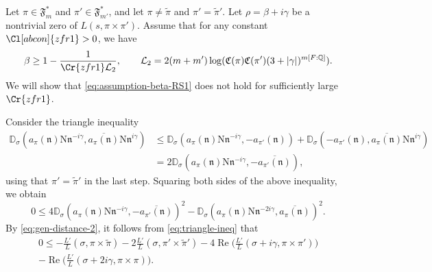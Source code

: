 \documentclass[12pt,reqno]{amsart}
\renewcommand{\tilde}{\widetilde}
\theoremstyle{remark}
\renewcommand{\tilde}{\widetilde}
\DeclareMathOperator{\Real}{Re}
\renewcommand{\tilde}{\widetilde}
\newcommand{\N}{\mathrm{N}}
\newcommand{\Q}{\mathbb{Q}}
\newcommand{\kn}{\mathfrak{n}}
\numberwithin{equation}{section}
\begin{document}
	Let $\pi\in\mathfrak{F}^*_m$ and $\pi' \in\mathfrak{F}^*_{m'}$, and let $\pi \neq\tilde{\pi}$ and $\pi'=\tilde{\pi}'$.  Let $\rho = \beta +i\gamma$ be a nontrivial zero of $L(s, \pi \times \pi')$. 
    Assume that for any constant $\Cl[abcon]{zfr1} > 0$, we have
    \begin{equation}\label{eq:assumption-beta-RS1}
		\begin{aligned}
			\beta
			\ge 1- \frac{1}{\Cr{zfr1}\mathcal{L}_2}, \qquad \mathcal{L}_2 = 2(m+m')\log(\mathfrak{C}(\pi)\mathfrak{C}(\pi') (3+|\gamma|)^{m[F:\Q]}).
		\end{aligned}
	\end{equation}
	We will show that \eqref{eq:assumption-beta-RS1} does not hold for sufficiently large $\Cr{zfr1}$. 
    
    Consider the triangle inequality
	\begin{align*}
		\mathbb{D}_{\sigma}(a_{\pi}(\kn)\N\kn^{-i\gamma}, \overline{a_{\pi}(\kn)}\N\kn^{i\gamma}) &\le \mathbb{D}_{\sigma}(a_{\pi}(\kn)\N\kn^{-i\gamma}, -a_{\pi'}(\kn)) +
		\mathbb{D}_{\sigma}(-a_{\pi'}(\kn), \overline{a_{\pi}(\kn)}\N\kn^{i\gamma})\\
		&= 2\mathbb{D}_{\sigma}(a_{\pi}(\kn)\N\kn^{-i\gamma}, -\overline{a_{\pi'}(\kn)}),
	\end{align*}
	using that $\pi' = \tilde{\pi}'$ in the last step. Squaring both sides of the above inequality, we obtain
	\begin{equation}
		\label{eq:triangle-ineq}
		0\le 4\mathbb{D}_{\sigma}(a_{\pi}(\kn)\N\kn^{-i\gamma}, -\overline{a_{\pi'}(\kn)})^2-\mathbb{D}_{\sigma}(a_{\pi}(\kn)\N\kn^{-2i\gamma}, \overline{a_{\pi}(\kn)})^2.
	\end{equation}
	By \eqref{eq:gen-distance-2}, it follows from \eqref{eq:triangle-ineq} that
    \begin{multline}\label{eq:rankin-4}
			0 \leq -\frac{L'}{L}(\sigma,\pi\times\tilde{\pi})-2\frac{L'}{L}(\sigma,\pi'\times\tilde{\pi}')-4\Real\Big(\frac{L'}{L}(\sigma+i\gamma,\pi\times\pi')\Big)\\
            - \Real\Big(\frac{L'}{L}(\sigma+2i\gamma,\pi\times\pi)\Big).
	\end{multline}
	
\end{document}
